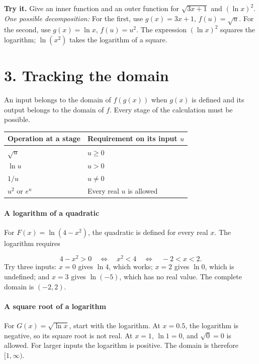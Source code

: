 \documentclass[11pt,letterpaper]{article}
\begin{document}
\textbf{Try it.} Give an inner function and an outer function for \(\sqrt{3x+1}\) and \((\ln x)^2\).
\textit{One possible decomposition:} For the first, use \(g(x)=3x+1\), \(f(u)=\sqrt u\). For the second, use \(g(x)=\ln x\), \(f(u)=u^2\). The expression \((\ln x)^2\) squares the logarithm; \(\ln(x^2)\) takes the logarithm of a square.







\section*{3. Tracking the domain}
An input belongs to the domain of \(f(g(x))\) when \(g(x)\) is defined and its output belongs to the domain of \(f\). Every stage of the calculation must be possible.


\begin{center}\small\begin{tabularx}{\linewidth}{>{\raggedright\arraybackslash}X>{\raggedright\arraybackslash}X}\toprule
Operation at a stage & Requirement on its input \(u\) \\
\midrule
\(\sqrt u\) & \(u\geq0\) \\
\(\ln u\) & \(u>0\) \\
\(1/u\) & \(u\ne0\) \\
\(u^2\) or \(e^u\) & Every real \(u\) is allowed \\
\bottomrule\end{tabularx}\end{center}



\paragraph{A logarithm of a quadratic} For \(F(x)=\ln(4-x^2)\), the quadratic is defined for every real \(x\). The logarithm requires

\[4-x^2>0\quad\Longleftrightarrow\quad x^2<4\quad\Longleftrightarrow\quad -2<x<2.\]Try three inputs: \(x=0\) gives \(\ln4\), which works; \(x=2\) gives \(\ln0\), which is undefined; and \(x=3\) gives \(\ln(-5)\), which has no real value. The complete domain is \((-2,2)\).




\paragraph{A square root of a logarithm} For \(G(x)=\sqrt{\ln x}\), start with the logarithm. At \(x=0.5\), the logarithm is negative, so its square root is not real. At \(x=1\), \(\ln1=0\), and \(\sqrt0=0\) is allowed. For larger inputs the logarithm is positive. The domain is therefore \([1,\infty)\).
\end{document}
